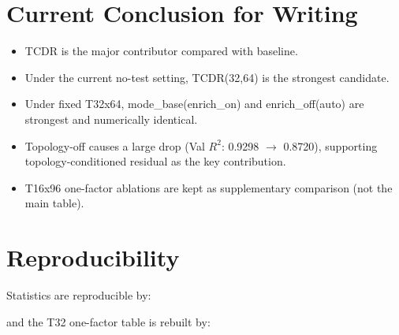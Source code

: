 \documentclass[11pt,a4paper]{article}
\begin{document}
\section{Current Conclusion for Writing}
\begin{itemize}
  \item TCDR is the major contributor compared with baseline.
  \item Under the current no-test setting, TCDR(32,64) is the strongest candidate.
  \item Under fixed T32x64, mode\_base(enrich\_on) and enrich\_off(auto) are strongest and numerically identical.
  \item Topology-off causes a large drop (Val $R^2$: 0.9298 $\rightarrow$ 0.8720), supporting topology-conditioned residual as the key contribution.
  \item T16x96 one-factor ablations are kept as supplementary comparison (not the main table).
\end{itemize}

\section{Reproducibility}
Statistics are reproducible by:
\begin{center}
\end{center}
and the T32 one-factor table is rebuilt by:
\begin{center}
\end{center}
\end{document}
